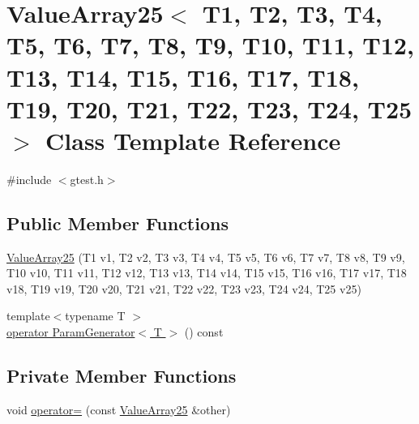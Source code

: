 \hypertarget{classtesting_1_1internal_1_1ValueArray25}{\section{\-Value\-Array25$<$ \-T1, \-T2, \-T3, \-T4, \-T5, \-T6, \-T7, \-T8, \-T9, \-T10, \-T11, \-T12, \-T13, \-T14, \-T15, \-T16, \-T17, \-T18, \-T19, \-T20, \-T21, \-T22, \-T23, \-T24, \-T25 $>$ \-Class \-Template \-Reference}
\label{d2/de9/classtesting_1_1internal_1_1ValueArray25}
}


{\ttfamily \#include $<$gtest.\-h$>$}

\subsection*{\-Public \-Member \-Functions}
\begin{DoxyCompactItemize}
\item 
\hyperlink{classtesting_1_1internal_1_1ValueArray25_aa0f3c34ba2bf7139455179b7ee97704b}{\-Value\-Array25} (\-T1 v1, \-T2 v2, \-T3 v3, \-T4 v4, \-T5 v5, \-T6 v6, \-T7 v7, \-T8 v8, \-T9 v9, \-T10 v10, \-T11 v11, \-T12 v12, \-T13 v13, \-T14 v14, \-T15 v15, \-T16 v16, \-T17 v17, \-T18 v18, \-T19 v19, \-T20 v20, \-T21 v21, \-T22 v22, \-T23 v23, \-T24 v24, \-T25 v25)
\item 
{\footnotesize template$<$typename T $>$ }\\\hyperlink{classtesting_1_1internal_1_1ValueArray25_a08ef46fa12c9dd8ef6fc630baeea89b7}{operator Param\-Generator$<$ T $>$} () const 
\end{DoxyCompactItemize}
\subsection*{\-Private \-Member \-Functions}
\begin{DoxyCompactItemize}
\item 
void \hyperlink{classtesting_1_1internal_1_1ValueArray25_ac9a00c5d94f4295c378537079da700a6}{operator=} (const \hyperlink{classtesting_1_1internal_1_1ValueArray25}{\-Value\-Array25} \&other)
\end{DoxyCompactItemize}
